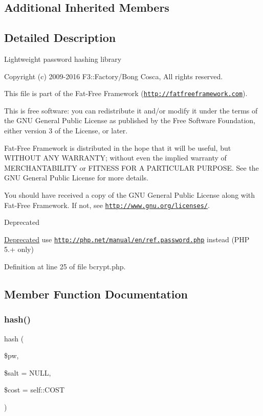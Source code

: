 \subsection*{Additional Inherited Members}


\subsection{Detailed Description}
Lightweight password hashing library

Copyright (c) 2009-\/2016 F3\+::\+Factory/\+Bong Cosca, All rights reserved.

This file is part of the Fat-\/\+Free Framework (\href{http://fatfreeframework.com}{\tt http\+://fatfreeframework.\+com}).

This is free software\+: you can redistribute it and/or modify it under the terms of the G\+NU General Public License as published by the Free Software Foundation, either version 3 of the License, or later.

Fat-\/\+Free Framework is distributed in the hope that it will be useful, but W\+I\+T\+H\+O\+UT A\+NY W\+A\+R\+R\+A\+N\+TY; without even the implied warranty of M\+E\+R\+C\+H\+A\+N\+T\+A\+B\+I\+L\+I\+TY or F\+I\+T\+N\+E\+SS F\+OR A P\+A\+R\+T\+I\+C\+U\+L\+AR P\+U\+R\+P\+O\+SE. See the G\+NU General Public License for more details.

You should have received a copy of the G\+NU General Public License along with Fat-\/\+Free Framework. If not, see \href{http://www.gnu.org/licenses/}{\tt http\+://www.\+gnu.\+org/licenses/}.

\begin{DoxyRefDesc}{Deprecated}
\item[\hyperlink{deprecated__deprecated000001}{Deprecated}]use \href{http://php.net/manual/en/ref.password.php}{\tt http\+://php.\+net/manual/en/ref.\+password.\+php} instead (P\+HP 5.+ only) \end{DoxyRefDesc}


Definition at line 25 of file bcrypt.\+php.



\subsection{Member Function Documentation}
\hypertarget{class_bcrypt_a027c5d961c1d96ac0fa2a0fcc4af1e71}{}\label{class_bcrypt_a027c5d961c1d96ac0fa2a0fcc4af1e71} 
\subsubsection{\texorpdfstring{hash()}{hash()}}
{\footnotesize\ttfamily hash (\begin{DoxyParamCaption}\item[{}]{\$pw,  }\item[{}]{\$salt = {\ttfamily NULL},  }\item[{}]{\$cost = {\ttfamily self\+:\+:COST} }\end{DoxyParamCaption})}

